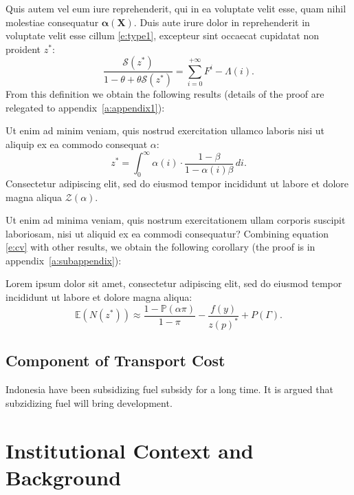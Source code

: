 \documentclass[letterpaper,12pt,leqno]{article}
\begin{document}
Quis autem vel eum iure reprehenderit, qui in ea voluptate velit esse, quam nihil molestiae consequatur $\bm{\alpha(X)}$. Duis aute irure dolor in reprehenderit in voluptate velit esse cillum \eqref{e:type1}, excepteur sint occaecat cupidatat non proident $z^*$:
\begin{equation*}
\frac{\mathcal{S}(z^*)}{1 -\theta + \theta \mathcal{S}(z^*)} = \sum_{i=0}^{+\infty}F^{i} - \Lambda(i).
\end{equation*}
From this definition we obtain the following results (details of the proof are relegated to appendix~\ref{a:appendix1}):

\begin{lemma}\label{p:cv} Ut enim ad minim veniam, quis nostrud exercitation ullamco laboris nisi ut aliquip ex ea commodo consequat $\alpha$:
\begin{equation}
z^* = \int_{0}^{\infty} \alpha(i) \cdot \frac{1-\beta}{1-\alpha(i)\beta}\,di.
\label{e:cv}\end{equation}
Consectetur adipiscing elit, sed do eiusmod tempor incididunt ut labore et dolore magna aliqua $\mathcal{Z}(\alpha)$. \end{lemma}

Ut enim ad minima veniam, quis nostrum exercitationem ullam corporis suscipit laboriosam, nisi ut aliquid ex ea commodi consequatur? Combining equation \eqref{e:cv} with other results, we obtain the following corollary (the proof is in appendix~\ref{a:subappendix}): 

\begin{corollary} Lorem ipsum dolor sit amet, consectetur adipiscing elit, sed do eiusmod tempor incididunt ut labore et dolore magna aliqua:
\begin{equation*}
\mathbb{E}(N(z^*)) \approx \frac{1-\mathbb{P}(\alpha\pi)}{1-\pi}- \frac{f(y)}{z(p)^*} +P(\Gamma).
\end{equation*}\end{corollary}

\subsection{Component of Transport Cost}

Indonesia have been subsidizing fuel subsidy for a long time. It is argued that subzidizing fuel will bring development.

\section{Institutional Context and Background}\label{s:context}
\end{document}
